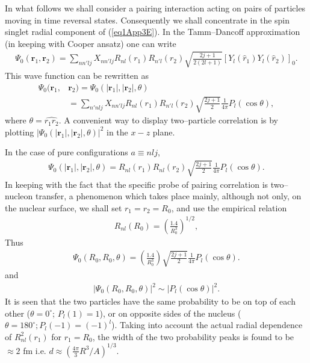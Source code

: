 \begin{subappendices}
In what follows we shall consider a pairing interaction acting on pairs of particles moving in time reversal states. Consequently we shall concentrate in the spin singlet radial component of (\ref{eq1App3E}). In the Tamm--Dancoff approximation (in keeping with Cooper ansatz) one can write
\begin{align}\label{eq2App3E}
\Psi_0(\mathbf r_1,\mathbf r_2)=\sum_{nn'lj}X_{nn'lj}R_{nl}(r_1)R_{n'l}(r_2)\sqrt{\frac{2j+1}{2(2l+1)}}\left[Y_l(\hat r_1)Y_l(\hat r_2)\right]_0.
\end{align}
This wave function can be rewritten as
\begin{align}\label{eq3App3Ex}
\nonumber\Psi_0(\mathbf r_1,&\mathbf r_2)=\Psi_0(|\mathbf r_1|,|\mathbf r_2|,\theta)\\
&=\sum_{n'nlj}X_{nn'lj}R_{nl}(r_1)R_{n'l}(r_2)\sqrt{\frac{2j+1}{2}}\frac{1}{4\pi}P_l(\cos\theta),
\end{align}
where $\theta=\widehat{r_1r_2}$. A convenient way to display two--particle correlation is by plotting $|\Psi_0(|\mathbf r_1|,|\mathbf r_2|,\theta)|^2$ in the $x-z$ plane.


In the case of pure configurations $a\equiv nlj$,
\begin{align}\label{eq4App3Ex}
\Psi_0(|\mathbf r_1|,|\mathbf r_2|,\theta)
=R_{nl}(r_1)R_{nl}(r_2)\sqrt{\frac{2j+1}{2}}\frac{1}{4\pi}P_l(\cos\theta).
\end{align}
In keeping with the fact that the specific probe of pairing correlation is two--nucleon transfer, a phenomenon which takes place mainly, although not only, on the nuclear surface, we shall set $r_1=r_2=R_0$, and use the empirical relation 
\begin{align}\label{eq5App3Ex}
R_{nl}(R_0)=\left(\frac{1.4}{R_0^3}\right)^{1/2},
\end{align}
Thus 
\begin{align}\label{eq6App3E}
\Psi_0(R_0,R_0,\theta)
=\left(\frac{1.4}{R_0^3}\right)\sqrt{\frac{2j+1}{2}}\frac{1}{4\pi}P_l(\cos\theta).
\end{align}
and 
\begin{align}\label{eq7App3E}
|\Psi_0(R_0,R_0,\theta)|^2\sim |P_l(\cos\theta)|^2.
\end{align}
It is seen that the two particles have the same probability to be on top of each other ($\theta=0^\circ$; $P_l(1)=1$), or on opposite sides of the nucleus ($\theta=180^\circ; P_l(-1)=(-1)^l$). Taking into account the actual radial dependence of $R^2_{nl}(r_1)$ for $r_1=R_0$, the width of the two probability peaks is found to be $\approx 2$ fm i.e. $d\approx\left(\frac{4\pi}{3}R^3/A\right)^{1/3}$.


\end{subappendices}
